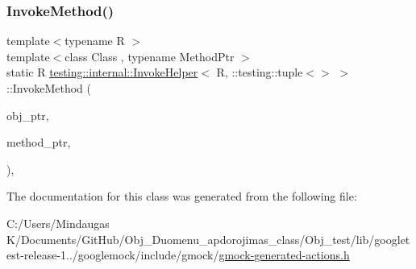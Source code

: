 \mbox{\label{classtesting_1_1internal_1_1_invoke_helper_3_01_r_00_01_1_1testing_1_1tuple_3_4_01_4_a0368e26cbc1bcb12abbfb802f8294fa0}} 
\subsubsection{\texorpdfstring{InvokeMethod()}{InvokeMethod()}}
{\footnotesize\ttfamily template$<$typename R $>$ \\
template$<$class Class , typename Method\+Ptr $>$ \\
static R \mbox{\hyperlink{classtesting_1_1internal_1_1_invoke_helper}{testing\+::internal\+::\+Invoke\+Helper}}$<$ R, \+::testing\+::tuple$<$$>$ $>$\+::Invoke\+Method (\begin{DoxyParamCaption}\item[{Class $\ast$}]{obj\+\_\+ptr,  }\item[{Method\+Ptr}]{method\+\_\+ptr,  }\item[{const \+::testing\+::tuple$<$$>$ \&}]{ }\end{DoxyParamCaption})\hspace{0.3cm}{\ttfamily [inline]}, {\ttfamily [static]}}



The documentation for this class was generated from the following file\+:\begin{DoxyCompactItemize}
\item 
C\+:/\+Users/\+Mindaugas K/\+Documents/\+Git\+Hub/\+Obj\+\_\+\+Duomenu\+\_\+apdorojimas\+\_\+class/\+Obj\+\_\+test/lib/googletest-\/release-\/1../googlemock/include/gmock/\mbox{\hyperlink{_obj__test_2lib_2googletest-release-1_88_81_2googlemock_2include_2gmock_2gmock-generated-actions_8h}{gmock-\/generated-\/actions.\+h}}\end{DoxyCompactItemize}

